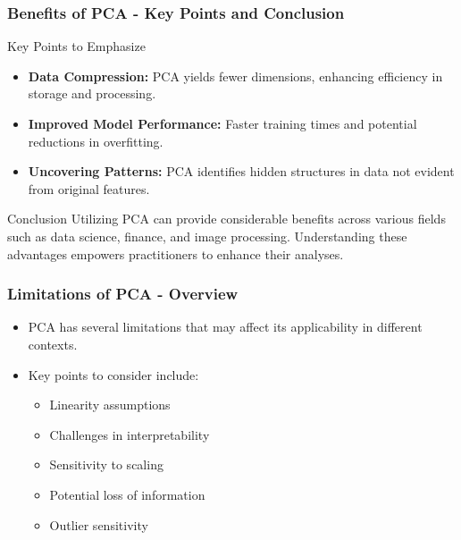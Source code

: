 \documentclass[aspectratio=169]{beamer}
\begin{document}
\begin{frame}[fragile]
  \frametitle{Benefits of PCA - Key Points and Conclusion}
  \begin{block}{Key Points to Emphasize}
    \begin{itemize}
      \item \textbf{Data Compression:} PCA yields fewer dimensions, enhancing efficiency in storage and processing.
      \item \textbf{Improved Model Performance:} Faster training times and potential reductions in overfitting.
      \item \textbf{Uncovering Patterns:} PCA identifies hidden structures in data not evident from original features.
    \end{itemize}
  \end{block}

  \begin{block}{Conclusion}
    Utilizing PCA can provide considerable benefits across various fields such as data science, finance, and image processing. Understanding these advantages empowers practitioners to enhance their analyses.
  \end{block}
\end{frame}

\begin{frame}[fragile]
  \frametitle{Limitations of PCA - Overview}
  \begin{itemize}
    \item PCA has several limitations that may affect its applicability in different contexts.
    \item Key points to consider include:
      \begin{itemize}
        \item Linearity assumptions
        \item Challenges in interpretability
        \item Sensitivity to scaling
        \item Potential loss of information
        \item Outlier sensitivity
      \end{itemize}
  \end{itemize}
\end{frame}
\end{document}
